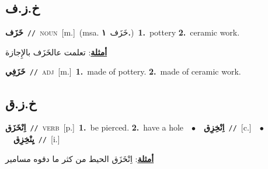\documentclass[10pt,a4paper,twoside]{article} %
\begin{document}
\begin{multicols}{2}
\vspace{-3mm}
\subsection*{\color{blue}\foreignlanguage{arabic}{خ.ز.ف}\color{blue}{}} 

{\setlength\topsep{0pt}\textbf{\foreignlanguage{arabic}{خَزَف}}\ {\color{gray}\texttt{//}\color{black}}\ \textsc{noun}\ [m.]\ \color{gray}(msa. \foreignlanguage{arabic}{خَزَف}~\foreignlanguage{arabic}{\textbf{١.}})\color{black}\ \textbf{1.}~pottery  \textbf{2.}~ceramic work.\  \begin{flushright}\color{gray}\foreignlanguage{arabic}{\textbf{\underline{\foreignlanguage{arabic}{أمثلة}}}: تعلمت عالخَزَف بالإِجازة}\end{flushright}\color{black}} \vspace{2mm}

{\setlength\topsep{0pt}\textbf{\foreignlanguage{arabic}{خَزَفِي}}\ {\color{gray}\texttt{//}\color{black}}\ \textsc{adj}\ [m.]\ \textbf{1.}~made of pottery.  \textbf{2.}~made of ceramic work.\ } \vspace{2mm}

\vspace{-3mm}
\subsection*{\color{blue}\foreignlanguage{arabic}{خ.ز.ق}\color{blue}{}} 

{\setlength\topsep{0pt}\textbf{\foreignlanguage{arabic}{اِنْخَزَق}}\ {\color{gray}\texttt{//}\color{black}}\ \textsc{verb}\ [p.]\ \textbf{1.}~be pierced.  \textbf{2.}~have a hole\ \ $\bullet$\ \ \setlength\topsep{0pt}\textbf{\foreignlanguage{arabic}{اِنْخِزِق}}\ {\color{gray}\texttt{//}\color{black}}\ [c.]\ \ $\bullet$\ \ \setlength\topsep{0pt}\textbf{\foreignlanguage{arabic}{يِنْخِزِق}}\ {\color{gray}\texttt{//}\color{black}}\ [i.]\  \begin{flushright}\color{gray}\foreignlanguage{arabic}{\textbf{\underline{\foreignlanguage{arabic}{أمثلة}}}: اِنْخَزَق الحيط من كثر ما دقوه مسامير}\end{flushright}\color{black}} \vspace{2mm}


\end{multicols}
\end{document}
